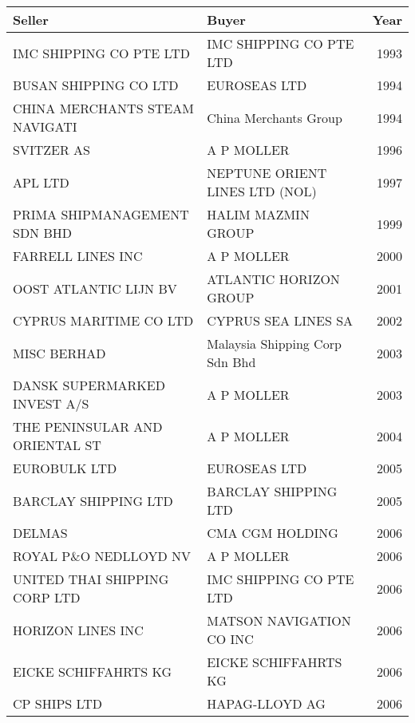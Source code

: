 
\begin{tabular}[t]{llr}
\toprule
Seller & Buyer & Year\\
\midrule
IMC SHIPPING CO PTE LTD & IMC SHIPPING CO PTE LTD & 1993\\
BUSAN SHIPPING CO LTD & EUROSEAS LTD & 1994\\
CHINA MERCHANTS STEAM NAVIGATI & China Merchants Group & 1994\\
SVITZER AS & A P MOLLER & 1996\\
APL LTD & NEPTUNE ORIENT LINES LTD (NOL) & 1997\\
PRIMA SHIPMANAGEMENT SDN BHD & HALIM MAZMIN GROUP & 1999\\
FARRELL LINES INC & A P MOLLER & 2000\\
OOST ATLANTIC LIJN BV & ATLANTIC HORIZON GROUP & 2001\\
CYPRUS MARITIME CO LTD & CYPRUS SEA LINES SA & 2002\\
MISC BERHAD & Malaysia Shipping Corp Sdn Bhd & 2003\\
DANSK SUPERMARKED INVEST A/S & A P MOLLER & 2003\\
THE PENINSULAR AND ORIENTAL ST & A P MOLLER & 2004\\
EUROBULK LTD & EUROSEAS LTD & 2005\\
BARCLAY SHIPPING LTD & BARCLAY SHIPPING LTD & 2005\\
DELMAS & CMA CGM HOLDING & 2006\\
ROYAL P\&O NEDLLOYD NV & A P MOLLER & 2006\\
UNITED THAI SHIPPING CORP LTD & IMC SHIPPING CO PTE LTD & 2006\\
HORIZON LINES INC & MATSON NAVIGATION CO INC & 2006\\
EICKE SCHIFFAHRTS KG & EICKE SCHIFFAHRTS KG & 2006\\
CP SHIPS LTD & HAPAG-LLOYD AG & 2006\\
\bottomrule
\end{tabular}

